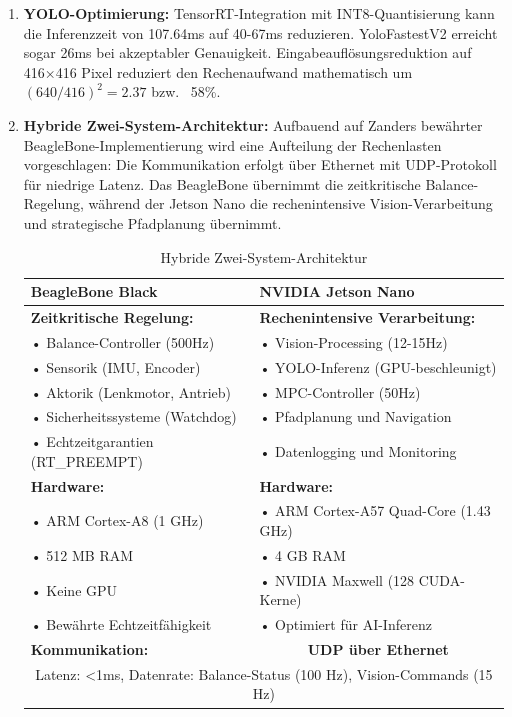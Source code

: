 \begin{enumerate}
\item \textbf{YOLO-Optimierung:} TensorRT-Integration mit INT8-Quantisierung kann die Inferenzzeit von 107.64ms auf 40-67ms reduzieren\citep{tensorrt_optimization}. YoloFastestV2 erreicht sogar 26ms bei akzeptabler Genauigkeit\citep{qengineering_yolo_fastest}. Eingabeauflösungsreduktion auf 416×416 Pixel reduziert den Rechenaufwand mathematisch um $(640/416)^2 = 2.37$ bzw. ~58\%\citep{yolo_resolution_scaling}.

\item \textbf{Hybride Zwei-System-Architektur:} Aufbauend auf Zanders bewährter BeagleBone-Implementierung wird eine Aufteilung der Rechenlasten vorgeschlagen:
Die Kommunikation erfolgt über Ethernet mit UDP-Protokoll für niedrige Latenz. Das BeagleBone übernimmt die zeitkritische Balance-Regelung, während der Jetson Nano die rechenintensive Vision-Verarbeitung und strategische Pfadplanung übernimmt.

\begin{table}[htbp]
\centering
\caption{Hybride Zwei-System-Architektur}
\label{tab:hybrid-architecture}
\begin{tabular}{|p{}|p{}|}
\hline
\textbf{BeagleBone Black} & \textbf{NVIDIA Jetson Nano} \\
\hline
\textbf{Zeitkritische Regelung:} & \textbf{Rechenintensive Verarbeitung:} \\
• Balance-Controller (500Hz) & • Vision-Processing (12-15Hz) \\
• Sensorik (IMU, Encoder) & • YOLO-Inferenz (GPU-beschleunigt) \\
• Aktorik (Lenkmotor, Antrieb) & • MPC-Controller (50Hz) \\
• Sicherheitssysteme (Watchdog) & • Pfadplanung und Navigation \\
• Echtzeitgarantien (RT\_PREEMPT) & • Datenlogging und Monitoring \\
\hline
\textbf{Hardware:} & \textbf{Hardware:} \\
• ARM Cortex-A8 (1 GHz) & • ARM Cortex-A57 Quad-Core (1.43 GHz) \\
• 512 MB RAM & • 4 GB RAM \\
• Keine GPU & • NVIDIA Maxwell (128 CUDA-Kerne) \\
• Bewährte Echtzeitfähigkeit & • Optimiert für AI-Inferenz \\
\hline
\textbf{Kommunikation:} & \multicolumn{1}{c|}{\textbf{UDP über Ethernet}} \\
\multicolumn{2}{|c|}{Latenz: <1ms, Datenrate: Balance-Status (100 Hz), Vision-Commands (15 Hz)} \\
\hline
\end{tabular}
\end{table}



\end{enumerate}
